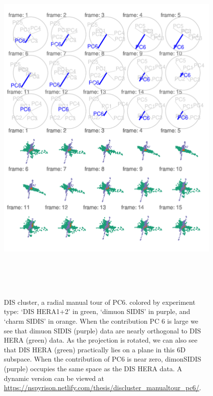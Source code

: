 \documentclass{monashthesis}
\begin{document}
\begin{figure}

{\centering \includegraphics[width=6in,height=7.2in]{./figures/DISclusterGood} 

}

\caption{DIS cluster, a radial manual tour of PC6. colored by experiment type: `DIS HERA1+2' in green, `dimuon SIDIS' in purple, and `charm SIDIS' in orange. When the contribution PC 6 is large we see that dimuon SIDIS (purple) data are nearly orthogonal to DIS HERA (green) data. As the projection is rotated, we can also see that DIS HERA (green) practically lies on a plane in this 6D subspace. When the contribution of PC6 is near zero, dimonSIDIS (purple) occupies the same space as the DIS HERA data. A dynamic version can be viewed at \url{https://nspyrison.netlify.com/thesis/discluster_manualtour_pc6/}.}\label{fig:DISclusterGood}
\end{figure}
\end{document}
